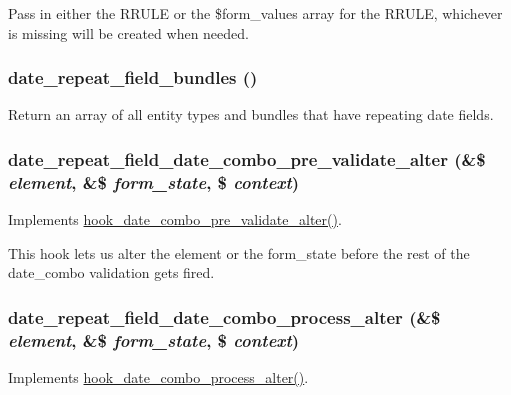 Pass in either the RRULE or the \$form\_\-values array for the RRULE, whichever is missing will be created when needed. \hypertarget{date__repeat__field_8module_ac417a86109a016a6b5fea0f1fb9ab753}{
\subsubsection[{date\_\-repeat\_\-field\_\-bundles}]{\setlength{\rightskip}{0pt plus 5cm}date\_\-repeat\_\-field\_\-bundles ()}}
\label{date__repeat__field_8module_ac417a86109a016a6b5fea0f1fb9ab753}
Return an array of all entity types and bundles that have repeating date fields. \hypertarget{date__repeat__field_8module_a288466bfc9261d718cdfc0bcfa1d0504}{
\subsubsection[{date\_\-repeat\_\-field\_\-date\_\-combo\_\-pre\_\-validate\_\-alter}]{\setlength{\rightskip}{0pt plus 5cm}date\_\-repeat\_\-field\_\-date\_\-combo\_\-pre\_\-validate\_\-alter (\&\$ {\em element}, \/  \&\$ {\em form\_\-state}, \/  \$ {\em context})}}
\label{date__repeat__field_8module_a288466bfc9261d718cdfc0bcfa1d0504}
Implements \hyperlink{date_8api_8php_acb65970e9f533601f60f43e490e85356}{hook\_\-date\_\-combo\_\-pre\_\-validate\_\-alter()}.

This hook lets us alter the element or the form\_\-state before the rest of the date\_\-combo validation gets fired. \hypertarget{date__repeat__field_8module_a534e8b80a23eabf8f5cc19a22f3cf4df}{
\subsubsection[{date\_\-repeat\_\-field\_\-date\_\-combo\_\-process\_\-alter}]{\setlength{\rightskip}{0pt plus 5cm}date\_\-repeat\_\-field\_\-date\_\-combo\_\-process\_\-alter (\&\$ {\em element}, \/  \&\$ {\em form\_\-state}, \/  \$ {\em context})}}
\label{date__repeat__field_8module_a534e8b80a23eabf8f5cc19a22f3cf4df}
Implements \hyperlink{date_8api_8php_abbae4e6ce7b9d70996e06174fc11497c}{hook\_\-date\_\-combo\_\-process\_\-alter()}.

